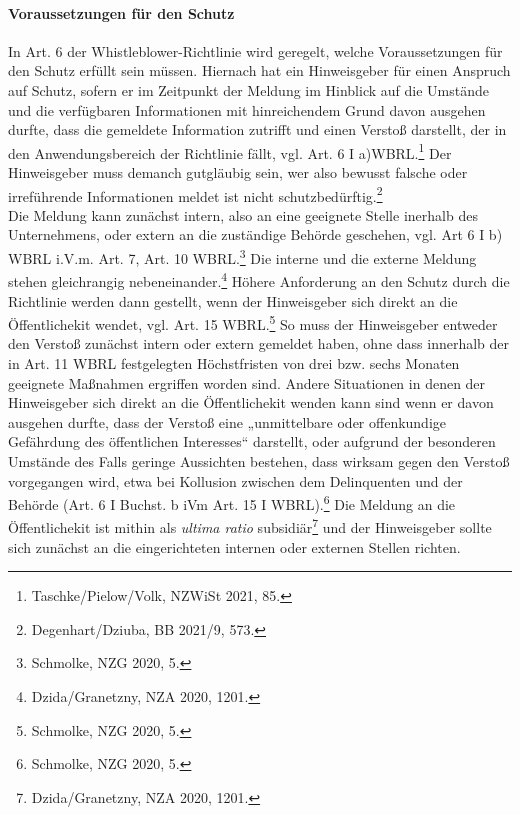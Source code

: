 \paragraph{Voraussetzungen für den Schutz}
In Art. 6 der Whistleblower-Richtlinie wird geregelt, welche Voraussetzungen für den Schutz erfüllt sein müssen.
Hiernach hat ein Hinweisgeber für einen Anspruch auf Schutz, sofern er im Zeitpunkt der Meldung im Hinblick auf die Umstände und die verfügbaren Informationen mit hinreichendem Grund davon ausgehen durfte, dass die gemeldete Information zutrifft und einen Verstoß darstellt, der in den Anwendungsbereich der Richtlinie fällt, vgl. Art. 6 I a)WBRL.\footnote{Taschke/Pielow/Volk, NZWiSt 2021, 85.}
Der Hinweisgeber muss demanch gutgläubig sein, wer also bewusst falsche oder irreführende Informationen meldet ist nicht schutzbedürftig.\footnote{Degenhart/Dziuba, BB 2021/9, 573.}\\
Die Meldung kann zunächst intern, also an eine geeignete Stelle inerhalb des Unternehmens, oder extern an die zuständige Behörde geschehen, vgl. Art 6 I b) WBRL i.V.m. Art. 7, Art. 10 WBRL.\footnote{Schmolke, NZG 2020, 5.}
Die interne und die externe Meldung stehen gleichrangig nebeneinander.\footnote{Dzida/Granetzny, NZA 2020, 1201.}
Höhere Anforderung an den Schutz durch die Richtlinie werden dann gestellt, wenn der Hinweisgeber sich direkt an die Öffentlichekit wendet, vgl. Art. 15 WBRL.\footnote{Schmolke, NZG 2020, 5.}
So muss der Hinweisgeber entweder den Verstoß zunächst intern oder extern gemeldet haben, ohne dass innerhalb der in Art. 11 WBRL festgelegten Höchstfristen von drei bzw. sechs Monaten geeignete Maßnahmen ergriffen worden sind.
Andere Situationen in denen der Hinweisgeber sich direkt an die Öffentlichekit wenden kann sind wenn er davon ausgehen durfte, dass der Verstoß eine „unmittelbare oder offenkundige Gefährdung des öffentlichen Interesses“ darstellt, oder aufgrund der besonderen Umstände des Falls geringe Aussichten bestehen, dass wirksam gegen den Verstoß vorgegangen wird, etwa bei Kollusion zwischen dem Delinquenten und der Behörde (Art. 6 I Buchst. b iVm Art. 15 I WBRL).\footnote{Schmolke, NZG 2020, 5.}
Die Meldung an die Öffentlichekit ist mithin als \textit{ultima ratio} subsidiär\footnote{Dzida/Granetzny, NZA 2020, 1201.} und der Hinweisgeber sollte sich zunächst an die eingerichteten internen oder externen Stellen richten.

